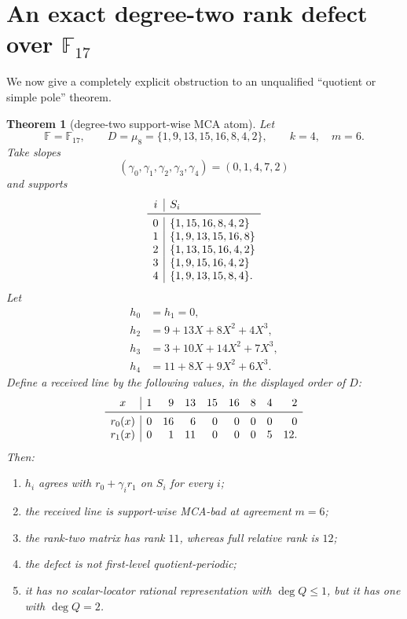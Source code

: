 \documentclass[11pt,a4paper]{amsart}
\numberwithin{equation}{section}
\newtheorem{theorem}{Theorem}[section]
\theoremstyle{remark}
\newcommand{\F}{\mathbb F}\newcommand{\B}{\mathbb B}\newcommand{\K}{\mathbb K}\newcommand{\Z}{\mathbb Z}
\begin{document}
\section{An exact degree-two rank defect over \texorpdfstring{$\F_{17}$}{F17}}

We now give a completely explicit obstruction to an unqualified ``quotient or simple pole'' theorem.

\begin{theorem}[degree-two support-wise MCA atom]\label{thm:f17-atom}
Let
\[
 \F=\F_{17},\qquad
 D=\mu_8=\{1,9,13,15,16,8,4,2\},
 \qquad k=4,\quad m=6.
\]
Take slopes
\[
 (\gamma_0,\gamma_1,\gamma_2,\gamma_3,\gamma_4)=(0,1,4,7,2)
\]
and supports
\[
\begin{array}{c|l}
 i&S_i\\
\midrule
0&\{1,15,16,8,4,2\}\\
1&\{1,9,13,15,16,8\}\\
2&\{1,13,15,16,4,2\}\\
3&\{1,9,15,16,4,2\}\\
4&\{1,9,13,15,8,4\}.
\end{array}
\]
Let
\[
\begin{aligned}
 h_0&=h_1=0,\\
 h_2&=9+13X+8X^2+4X^3,\\
 h_3&=3+10X+14X^2+7X^3,\\
 h_4&=11+8X+9X^2+6X^3.
\end{aligned}
\]
Define a received line by the following values, in the displayed order of $D$:
\[
\begin{array}{c|rrrrrrrr}
 x&1&9&13&15&16&8&4&2\\
\midrule
r_0(x)&0&16&6&0&0&0&0&0\\
 r_1(x)&0&1&11&0&0&0&5&12.
\end{array}
\]
Then:
\begin{enumerate}[label=\textup{(\roman*)}]
\item $h_i$ agrees with $r_0+\gamma_i r_1$ on $S_i$ for every $i$;
\item the received line is support-wise MCA-bad at agreement $m=6$;
\item the rank-two matrix has rank $11$, whereas full relative rank is $12$;
\item the defect is not first-level quotient-periodic;
\item it has no scalar-locator rational representation with $\deg Q\le1$, but it has one with $\deg Q=2$.
\end{enumerate}
\end{theorem}
\end{document}
